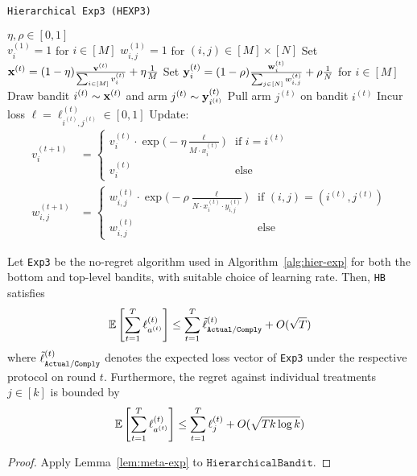 \begin{algorithm}[tb]
   \caption{\texttt{Hierarchical Exp3 (HEXP3)}}
   \label{alg:meta-exp2}
   \begin{algorithmic}   
       $\eta,\rho\in[0,1]$\\
      \STATE $v^{(1)}_{i}=1$ for $i\in[M]$
   	\STATE $w^{(1)}_{i,j}=1$ for $(i,j)\in[M]\times[N]$
	   \STATE Set ${\mathbf x}^{(t)} = (1-\eta) \frac{{\mathbf v}^{(t)}}{\sum_{i\in[M]} v^{(t)}_{i}} + \eta\frac{1}{M}$
	   \STATE Set ${\mathbf y}^{(t)}_{i} = (1-\rho)\frac{{\mathbf w}^{(t)}_{i}}{\sum_{j\in[N]} w^{(t)}_{i,j}} + \rho\frac{1}{N}$ for $i\in[M]$
	\STATE Draw bandit $i^{(t)}\sim {\mathbf x}^{(t)}$ and arm $j^{(t)}\sim {\mathbf y}^{(t)}_{i^{(t)}}$
	\STATE Pull arm $j^{(t)}$ on bandit $i^{(t)}$
	   \STATE Incur loss $\ell =\ell_{i^{(t)}, j^{(t)}}^{(t)}\in [0,1]$ 
	\STATE Update:
	\begin{align}
		v^{(t+1)}_i & = \begin{cases}
			v^{(t)}_{i}\cdot 
			\exp\big(-\eta \frac{\ell}{M\cdot x_{i}^{(t)}}\big) & \text{if } i=i^{(t)} \\
			v^{(t)}_{i} & \text{else}
		\end{cases}		 
		\\
		w^{(t+1)}_{i,j} & = \begin{cases}
			w^{(t)}_{i,j}\cdot \exp\big(-\rho\frac{\ell}{N\cdot x_i^{(t)}\cdot y_{i,j}^{(t)}}\big) 
			& \text{if }(i,j)=(i^{(t)}, j^{(t)}) \\
			w^{(t)}_{i,j} &\text{else}
		\end{cases}
	\end{align}
   	\ENDFOR
   	\end{algorithmic}
\end{algorithm}


\begin{thm}\label{thm:cexp}\eod
	Let \texttt{Exp3} be the no-regret algorithm used in Algorithm~\ref{alg:hier-exp} for both the bottom and top-level bandits, with suitable choice of learning rate. Then, \texttt{HB} satisfies
	\begin{equation}
		\operatorname*{\mathbb E}\left[\sum_{t=1}^T\ell^{(t)}_{a^{(t)}}\right]
		\leq \sum_{t=1}^T \tilde{\ell}^{(t)}_{{\texttt{Actual}}/{\texttt{Comply}}}
		+ O(\sqrt{T})
	\end{equation}
	where $\tilde{\ell}^{(t)}_{{\texttt{Actual}}/{\texttt{Comply}}}$ denotes the expected loss vector of \texttt{Exp3} under the respective protocol on round $t$. 
	Furthermore, the regret against individual treatments $j\in[k]$ is bounded by
	\begin{equation}
		\operatorname*{\mathbb E}\left[\sum_{t=1}^{T} \ell^{(t)}_{a^{(t)}}\right]
		\leq \sum_{t=1}^T\ell^{(t)}_{j}
		+ O(\sqrt{T k\log k})
	\end{equation}
\end{thm}

\begin{proof}
	Apply Lemma~\ref{lem:meta-exp} to $\texttt{HierarchicalBandit}$.
\end{proof}



